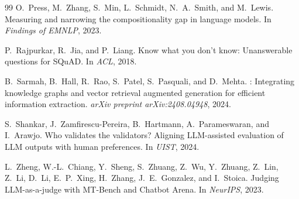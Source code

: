 \documentclass[11pt,a4paper]{article}
\begin{document}
\begin{thebibliography}{99}
O.~Press, M.~Zhang, S.~Min, L.~Schmidt, N.~A.~Smith, and M.~Lewis.
\newblock Measuring and narrowing the compositionality gap in language models.
\newblock In \emph{Findings of EMNLP}, 2023.

P.~Rajpurkar, R.~Jia, and P.~Liang.
\newblock Know what you don't know: Unanswerable questions for {SQuAD}.
\newblock In \emph{ACL}, 2018.

B.~Sarmah, B.~Hall, R.~Rao, S.~Patel, S.~Pasquali, and D.~Mehta.
: Integrating knowledge graphs and vector retrieval augmented generation for efficient information extraction.
\newblock \emph{arXiv preprint arXiv:2408.04948}, 2024.

S.~Shankar, J.~Zamfirescu-Pereira, B.~Hartmann, A.~Parameswaran, and I.~Arawjo.
\newblock Who validates the validators? {A}ligning {LLM}-assisted evaluation of {LLM} outputs with human preferences.
\newblock In \emph{UIST}, 2024.

L.~Zheng, W.-L.~Chiang, Y.~Sheng, S.~Zhuang, Z.~Wu, Y.~Zhuang, Z.~Lin, Z.~Li, D.~Li, E.~P.~Xing, H.~Zhang, J.~E.~Gonzalez, and I.~Stoica.
\newblock Judging {LLM}-as-a-judge with {MT-Bench} and {Chatbot Arena}.
\newblock In \emph{NeurIPS}, 2023.

\end{thebibliography}
\end{document}
